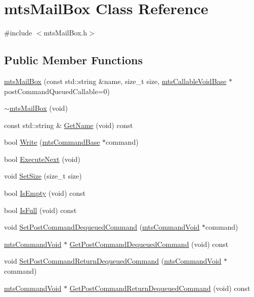 \hypertarget{classmts_mail_box}{\section{mts\-Mail\-Box Class Reference}
\label{classmts_mail_box}
}


{\ttfamily \#include $<$mts\-Mail\-Box.\-h$>$}

\subsection*{Public Member Functions}
\begin{DoxyCompactItemize}
\item 
\hyperlink{classmts_mail_box_a06a0abec903ca41c875d0bcdb8c53ebc}{mts\-Mail\-Box} (const std\-::string \&name, size\-\_\-t size, \hyperlink{classmts_callable_void_base}{mts\-Callable\-Void\-Base} $\ast$post\-Command\-Queued\-Callable=0)
\item 
\hyperlink{classmts_mail_box_ab20b400d82db33fd56a285771ac03ec2}{$\sim$mts\-Mail\-Box} (void)
\item 
const std\-::string \& \hyperlink{classmts_mail_box_aadf082bf9196ca93576599fd23cab55c}{Get\-Name} (void) const 
\item 
bool \hyperlink{classmts_mail_box_abcaf2f8760c31ced98abbbff0f9374e4}{Write} (\hyperlink{classmts_command_base}{mts\-Command\-Base} $\ast$command)
\item 
bool \hyperlink{classmts_mail_box_ab6a23137faacef309d53a0b3ffc985a8}{Execute\-Next} (void)
\item 
void \hyperlink{classmts_mail_box_a1224e07589e01a5a1c80f3dcc5f3c14a}{Set\-Size} (size\-\_\-t size)
\item 
bool \hyperlink{classmts_mail_box_aabf221528804d0ff287eb3b1ffe78b20}{Is\-Empty} (void) const 
\item 
bool \hyperlink{classmts_mail_box_ab5c7ee34e956c7c79288018a353b1ce6}{Is\-Full} (void) const 
\item 
void \hyperlink{classmts_mail_box_a12272c44ebcb68cfcfaf59f18cda21d3}{Set\-Post\-Command\-Dequeued\-Command} (\hyperlink{classmts_command_void}{mts\-Command\-Void} $\ast$command)
\item 
\hyperlink{classmts_command_void}{mts\-Command\-Void} $\ast$ \hyperlink{classmts_mail_box_af703607d2b078aadcfb079027b2221cf}{Get\-Post\-Command\-Dequeued\-Command} (void) const 
\item 
void \hyperlink{classmts_mail_box_a8a2d79ee98f9d4d87d595bc070a2b465}{Set\-Post\-Command\-Return\-Dequeued\-Command} (\hyperlink{classmts_command_void}{mts\-Command\-Void} $\ast$command)
\item 
\hyperlink{classmts_command_void}{mts\-Command\-Void} $\ast$ \hyperlink{classmts_mail_box_a6951651caf769035f266ba409f369579}{Get\-Post\-Command\-Return\-Dequeued\-Command} (void) const 
\end{DoxyCompactItemize}


